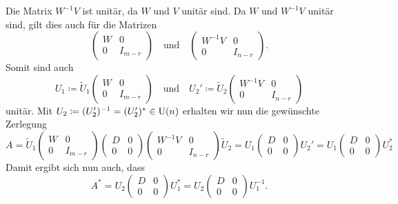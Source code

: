 Die Matrix $W^{-1} V$ ist unitär, da $W$ und $V$ unitär sind.
Da $W$ und $W^{-1} V$ unitär sind, gilt dies auch für die Matrizen
\[
  \begin{pmatrix}
    W & 0       \\
    0 & I_{m-r}
  \end{pmatrix}
  \quad\text{und}\quad
  \begin{pmatrix}
    W^{-1} V  & 0       \\
    0         & I_{n-r}
  \end{pmatrix}.
\]
Somit sind auch
\[
            U_1
  \coloneqq \tilde{U}_1
            \begin{pmatrix}
              W & 0       \\
              0 & I_{m-r}
            \end{pmatrix}
  \quad
  \text{und}
  \quad
            U_2'
  \coloneqq \tilde{U}_2
            \begin{pmatrix}
              W^{-1} V  & 0       \\
              0         & I_{n-r}
            \end{pmatrix}
\]
unitär.
Mit $U_2 \coloneqq (U_2')^{-1} = (U_2')^* \in \operatorname{U}(n)$ erhalten wir nun die gewünschte Zerlegung
\[
    A
  = \tilde{U}_1
    \begin{pmatrix}
      W & 0       \\
      0 & I_{m-r}
    \end{pmatrix}
    \begin{pmatrix}
      D & 0 \\
      0 & 0
    \end{pmatrix}
    \begin{pmatrix}
      W^{-1} V  & 0       \\
      0         & I_{n-r}
    \end{pmatrix}
    \tilde{U}_2
  = U_1
    \begin{pmatrix}
      D & 0 \\
      0 & 0
    \end{pmatrix}
    U_2'
  = U_1
    \begin{pmatrix}
      D & 0 \\
      0 & 0
    \end{pmatrix}
    U_2^*
\]
Damit ergibt sich nun auch, dass
\[
    A^*
  = U_2
    \begin{pmatrix}
      D & 0 \\
      0 & 0
    \end{pmatrix}
    U_1^*
  = U_2
    \begin{pmatrix}
      D & 0 \\
      0 & 0
    \end{pmatrix}
    U_1^{-1}.
\]
